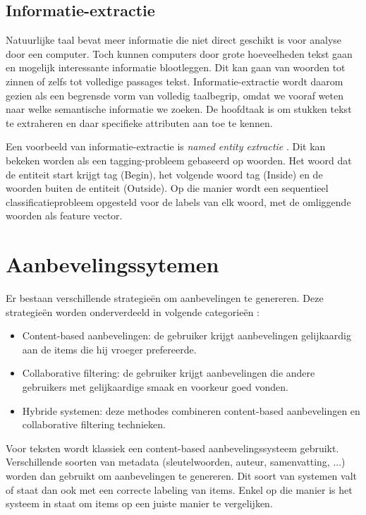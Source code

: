 \subsection{Informatie-extractie}\label{information-extraction}
Natuurlijke taal bevat meer informatie die niet direct geschikt is voor analyse door een computer. Toch kunnen computers door grote hoeveelheden tekst gaan en mogelijk interessante informatie blootleggen. Dit kan gaan van woorden tot zinnen of zelfs tot volledige passages tekst.
Informatie-extractie \cite{Wilks1997} wordt daarom gezien als een begrensde vorm van volledig taalbegrip, omdat we vooraf weten naar welke semantische informatie we zoeken. De hoofdtaak is om stukken tekst te extraheren en daar specifieke attributen aan toe te kennen. 

Een voorbeeld van informatie-extractie is \textit{named entity extractie} \cite{Chinchor1997}. Dit kan bekeken worden als een tagging-probleem gebaseerd op woorden. Het woord dat de entiteit start krijgt tag  (Begin), het volgende woord tag  (Inside) en de woorden buiten de entiteit  (Outside). Op die manier wordt een sequentieel classificatieprobleem opgesteld voor de labels van elk woord, met de omliggende woorden als feature vector.

\section{Aanbevelingssytemen}\label{bestaand:aanbeveling}	
Er bestaan verschillende strategie\"en om aanbevelingen te genereren. Deze strategie\"en worden onderverdeeld in volgende categorie\"en \cite{Adomavicius2005}: 
\begin{itemize}
\item Content-based aanbevelingen: de gebruiker krijgt aanbevelingen gelijkaardig aan de items die hij vroeger prefereerde.
\item Collaborative filtering: de gebruiker krijgt aanbevelingen die andere gebruikers met gelijkaardige smaak en voorkeur goed vonden. 
\item Hybride systemen: deze methodes combineren content-based aanbevelingen en collaborative filtering technieken.
\end{itemize}

Voor teksten wordt klassiek een content-based aanbevelingssysteem gebruikt. Verschillende soorten van metadata (sleutelwoorden, auteur, samenvatting, ...) worden dan gebruikt om aanbevelingen te genereren. Dit soort van systemen valt of staat dan ook met een correcte labeling van items. Enkel op die manier is het systeem in staat om items op een juiste manier te vergelijken. 

